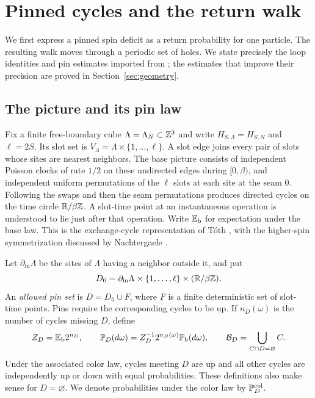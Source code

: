 \section{Pinned cycles and the return walk}\label{sec:loops}

We first express a pinned spin deficit as a return probability for one
particle.  The resulting walk moves through a periodic set of holes.
We state precisely the loop identities and pin estimates imported from
\cite{Ordering,BlochLaw}; the estimates that improve their precision are
proved in Section~\ref{sec:geometry}.

\subsection{The picture and its pin law}

Fix a finite free-boundary cube $\Lambda=\Lambda_N\subset\mathbb Z^3$ and write
$H_{S,\Lambda}=H_{S,N}$ and $\ell=2S$.  Its slot set is
$V_\Lambda=\Lambda\times\{1,\ldots,\ell\}$.
A slot edge joins every pair of slots whose sites are nearest neighbors.
The base picture consists of independent Poisson clocks of rate $1/2$
on these undirected edges during $[0,\beta)$, and independent uniform
permutations of the $\ell$ slots at each site at the seam $0$.
Following the swaps and then the seam permutations produces directed
cycles on the time circle $\mathbb R/\beta\mathbb Z$.  A slot-time point at an
instantaneous operation is understood to lie just after that operation.
Write $\mathbb E_{\mathrm b}$ for expectation under the base law.
This is the exchange-cycle representation of T\'oth \cite{Toth1993},
with the higher-spin symmetrization discussed by Nachtergaele
\cite[Section~2.2]{Nachtergaele1994}.

Let $\partial_{\mathrm{in}}\Lambda$ be the sites of $\Lambda$ having a
neighbor outside it, and put
\[
 D_0=\partial_{\mathrm{in}}\Lambda\times\{1,\ldots,\ell\}
                              \times(\mathbb R/\beta\mathbb Z).
\]
An \emph{allowed pin set} is $D=D_0\cup F$, where $F$ is a finite
deterministic set of slot-time points.  Pins require the corresponding
cycles to be up.  If $n_D(\omega)$ is the number of cycles missing $D$,
define
\begin{equation}\label{eq:pinlaw}
 Z_D=\mathbb E_{\mathrm b}2^{n_D},\qquad
 \mathbb P_D(d\omega)=Z_D^{-1}2^{n_D(\omega)}\mathbb P_{\mathrm b}(d\omega),
 \qquad
 \mathcal B_D=\bigcup_{C\cap D=\varnothing} C.
\end{equation}
Under the associated color law, cycles meeting $D$ are up and all other
cycles are independently up or down with equal probabilities.  These
definitions also make sense for $D=\varnothing$.  We denote probabilities
under the color law by $\mathbb P_D^{\mathrm{col}}$.

